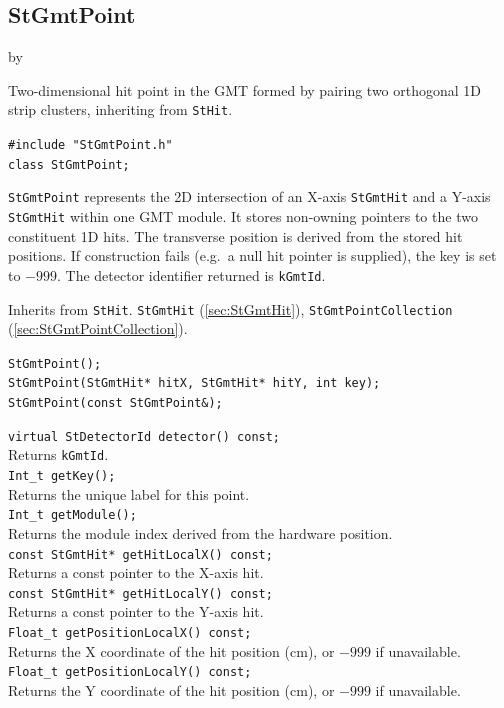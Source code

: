 \documentclass[twoside]{article}
\newcommand{\entrylabel}[1]{\mbox{\textbf{{#1}}}\hfil}%
\newenvironment{entry}
{\begin{list}{}%
    {\renewcommand{\makelabel}{\entrylabel}%
     \setlength{\labelwidth}{90pt}%
     \setlength{\leftmargin}{\labelwidth}
     \advance\leftmargin by \labelsep%
      }%
    }%
  {\end{list}}
\newcommand{\Entrylabel}[1]%
{\raisebox{0pt}[1ex][0pt]{\makebox[\labelwidth][l]%
    {\parbox[t]{\labelwidth}{\hspace{0pt}\textbf{{#1}}}}}}
\newenvironment{Entry}%
{\renewcommand{\entrylabel}{\Entrylabel}\begin{entry}}%
  {\end{entry}}
\begin{document}
\subsection{StGmtPoint}
\label{sec:StGmtPoint}
\begin{Entry}
\item[Summary] Two-dimensional hit point in the GMT formed by pairing two
    orthogonal 1D strip clusters, inheriting from \texttt{StHit}.
\item[Synopsis]
    \verb+#include "StGmtPoint.h"+\\
    \verb+class StGmtPoint;+\\
\item[Description]
    \texttt{StGmtPoint} represents the 2D intersection of an X-axis
    \texttt{StGmtHit} and a Y-axis \texttt{StGmtHit} within one GMT module.
    It stores non-owning pointers to the two constituent 1D hits.  The
    transverse position is derived from the stored hit positions.
    If construction fails (e.g.\ a null hit pointer is supplied), the key
    is set to $-999$.
    The detector identifier returned is \texttt{kGmtId}.
\item[Related Classes]
    Inherits from \texttt{StHit}.
    \texttt{StGmtHit} (\ref{sec:StGmtHit}),
    \texttt{StGmtPointCollection} (\ref{sec:StGmtPointCollection}).
\item[Public\\ Constructors]
    \verb+StGmtPoint();+\\
    \verb+StGmtPoint(StGmtHit* hitX, StGmtHit* hitY, int key);+\\
    \verb+StGmtPoint(const StGmtPoint&);+\\
\item[Public Member\\ Functions]
    \verb+virtual StDetectorId detector() const;+\\
    Returns \texttt{kGmtId}.\\
    \verb+Int_t getKey();+\\
    Returns the unique label for this point.\\
    \verb+Int_t getModule();+\\
    Returns the module index derived from the hardware position.\\
    \verb+const StGmtHit* getHitLocalX() const;+\\
    Returns a const pointer to the X-axis hit.\\
    \verb+const StGmtHit* getHitLocalY() const;+\\
    Returns a const pointer to the Y-axis hit.\\
    \verb+Float_t getPositionLocalX() const;+\\
    Returns the X coordinate of the hit position (cm), or $-999$ if unavailable.\\
    \verb+Float_t getPositionLocalY() const;+\\
    Returns the Y coordinate of the hit position (cm), or $-999$ if unavailable.\\
\end{Entry}
\clearpage
\end{document}
